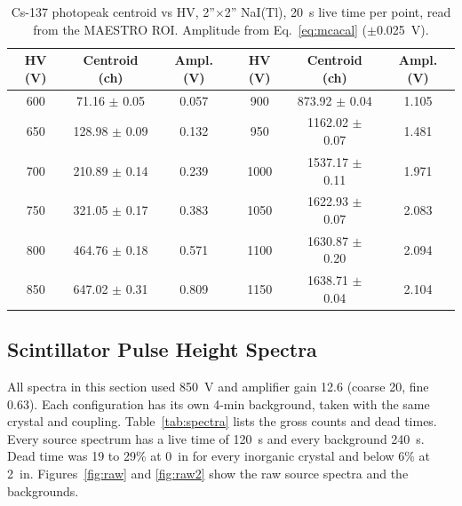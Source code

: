 \documentclass[12pt]{article}
\begin{document}
\begin{table}[!htbp]
\centering\small
\begin{tabular}{ccc|ccc}
\toprule
\textbf{HV (V)} & \textbf{Centroid (ch)} & \textbf{Ampl. (V)} & \textbf{HV (V)} & \textbf{Centroid (ch)} & \textbf{Ampl. (V)} \\
\midrule
600 & 71.16 $\pm$ 0.05 & 0.057 & 900 & 873.92 $\pm$ 0.04 & 1.105 \\
650 & 128.98 $\pm$ 0.09 & 0.132 & 950 & 1162.02 $\pm$ 0.07 & 1.481 \\
700 & 210.89 $\pm$ 0.14 & 0.239 & 1000 & 1537.17 $\pm$ 0.11 & 1.971 \\
750 & 321.05 $\pm$ 0.17 & 0.383 & 1050 & 1622.93 $\pm$ 0.07 & 2.083 \\
800 & 464.76 $\pm$ 0.18 & 0.571 & 1100 & 1630.87 $\pm$ 0.20 & 2.094 \\
850 & 647.02 $\pm$ 0.31 & 0.809 & 1150 & 1638.71 $\pm$ 0.04 & 2.104 \\
\bottomrule
\end{tabular}
\caption{Cs-137 photopeak centroid vs HV, 2''$\times$2'' NaI(Tl), 20~s live time per point, read from the MAESTRO ROI. Amplitude from Eq.~\ref{eq:mcacal} ($\pm$0.025~V).}
\label{tab:hv}
\end{table}

\subsection{Scintillator Pulse Height Spectra}

All spectra in this section used 850~V and amplifier gain 12.6 (coarse 20, fine 0.63). Each configuration has its own 4-min background, taken with the same crystal and coupling. Table~\ref{tab:spectra} lists the gross counts and dead times. Every source spectrum has a live time of 120~s and every background 240~s. Dead time was 19 to 29\% at 0~in for every inorganic crystal and below 6\% at 2~in. Figures~\ref{fig:raw} and \ref{fig:raw2} show the raw source spectra and the backgrounds.
\end{document}

